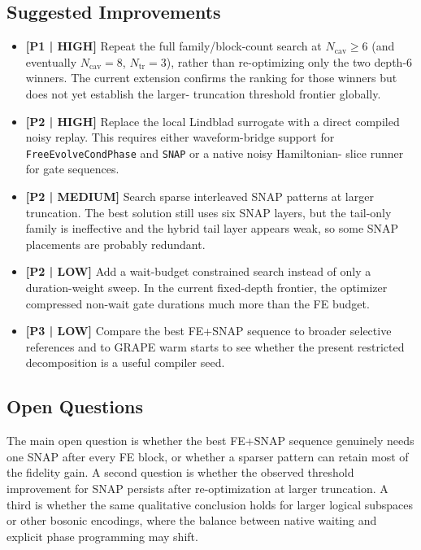 \documentclass[aps,pra,twocolumn,reprint,amsmath,amssymb]{revtex4-2}
\begin{document}
\subsection{Suggested Improvements}
\begin{itemize}
  \item \textbf{[P1 | HIGH]} Repeat the full family/block-count search at
  $N_{\mathrm{cav}}\geq 6$ (and eventually $N_{\mathrm{cav}}=8$, $N_{\mathrm{tr}}=3$),
  rather than re-optimizing only the two depth-6 winners. The current extension
  confirms the ranking for those winners but does not yet establish the larger-
  truncation threshold frontier globally.
  \item \textbf{[P2 | HIGH]} Replace the local Lindblad surrogate with a direct
  compiled noisy replay. This requires either waveform-bridge support for
  \texttt{FreeEvolveCondPhase} and \texttt{SNAP} or a native noisy Hamiltonian-
  slice runner for gate sequences.
  \item \textbf{[P2 | MEDIUM]} Search sparse interleaved SNAP patterns at larger
  truncation. The best solution still uses six SNAP layers, but the tail-only
  family is ineffective and the hybrid tail layer appears weak, so some SNAP
  placements are probably redundant.
  \item \textbf{[P2 | LOW]} Add a wait-budget constrained search instead of only
  a duration-weight sweep. In the current fixed-depth frontier, the optimizer
  compressed non-wait gate durations much more than the FE budget.
  \item \textbf{[P3 | LOW]} Compare the best FE+SNAP sequence to broader
  selective references and to GRAPE warm starts to see whether the present
  restricted decomposition is a useful compiler seed.
\end{itemize}

\subsection{Open Questions}
The main open question is whether the best FE+SNAP sequence genuinely needs one
SNAP after every FE block, or whether a sparser pattern can retain most of the
fidelity gain. A second question is whether the observed threshold improvement
for SNAP persists after re-optimization at larger truncation. A third is whether
the same qualitative conclusion holds for larger logical subspaces or other
bosonic encodings, where the balance between native waiting and explicit phase
programming may shift.
\end{document}
